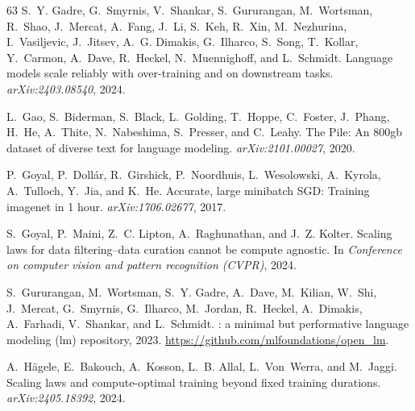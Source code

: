 \documentclass{article}
\theoremstyle{plain}
\theoremstyle{definition}
\theoremstyle{remark}
\begin{document}
\begin{thebibliography}{63}
S.~Y. Gadre, G.~Smyrnis, V.~Shankar, S.~Gururangan, M.~Wortsman, R.~Shao, J.~Mercat, A.~Fang, J.~Li, S.~Keh, R.~Xin, M.~Nezhurina, I.~Vasiljevic, J.~Jitsev, A.~G. Dimakis, G.~Ilharco, S.~Song, T.~Kollar, Y.~Carmon, A.~Dave, R.~Heckel, N.~Muennighoff, and L.~Schmidt.
\newblock Language models scale reliably with over-training and on downstream tasks.
\newblock \emph{arXiv:2403.08540}, 2024.

L.~Gao, S.~Biderman, S.~Black, L.~Golding, T.~Hoppe, C.~Foster, J.~Phang, H.~He, A.~Thite, N.~Nabeshima, S.~Presser, and C.~Leahy.
\newblock The {P}ile: An 800gb dataset of diverse text for language modeling.
\newblock \emph{arXiv:2101.00027}, 2020.

P.~Goyal, P.~Doll{\'a}r, R.~Girshick, P.~Noordhuis, L.~Wesolowski, A.~Kyrola, A.~Tulloch, Y.~Jia, and K.~He.
\newblock Accurate, large minibatch {SGD}: Training imagenet in 1 hour.
\newblock \emph{arXiv:1706.02677}, 2017.

S.~Goyal, P.~Maini, Z.~C. Lipton, A.~Raghunathan, and J.~Z. Kolter.
\newblock Scaling laws for data filtering--data curation cannot be compute agnostic.
\newblock In \emph{Conference on computer vision and pattern recognition (CVPR)}, 2024.

S.~Gururangan, M.~Wortsman, S.~Y. Gadre, A.~Dave, M.~Kilian, W.~Shi, J.~Mercat, G.~Smyrnis, G.~Ilharco, M.~Jordan, R.~Heckel, A.~Dimakis, A.~Farhadi, V.~Shankar, and L.~Schmidt.
: a minimal but performative language modeling (lm) repository, 2023.
\newblock \url{https://github.com/mlfoundations/open_lm}.

A.~H{\"a}gele, E.~Bakouch, A.~Kosson, L.~B. Allal, L.~Von~Werra, and M.~Jaggi.
\newblock Scaling laws and compute-optimal training beyond fixed training durations.
\newblock \emph{arXiv:2405.18392}, 2024.


\end{thebibliography}
\end{document}
